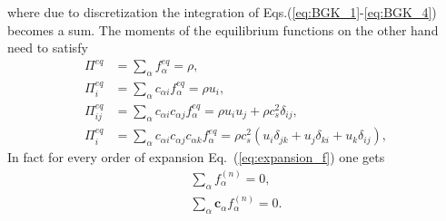 where due to discretization the integration of Eqs.(\ref{eq:BGK_1}-\ref{eq:BGK_4}) becomes a sum.
The moments of the equilibrium functions on the other hand need to satisfy~\cite{chen1998lattice} 
\begin{align}
    \Pi^{eq} &= \sum_{\alpha} f_{\alpha}^{eq} = \rho, \label{eq:moments_equilibria_1}\\
    \Pi^{eq}_i &= \sum_{\alpha} c_{\alpha i}f_{\alpha}^{eq} = \rho u_i, \label{eq:moments_equilibria_2}\\
    \Pi^{eq}_{i j} &= \sum_{\alpha} c_{\alpha i} c_{\alpha j}f_{\alpha}^{eq} = \rho u_i u_j + \rho c_s^2\delta_{i j}, \label{eq:moments_equilibria_3}\\
    \Pi^{eq}_i &= \sum_{\alpha} c_{\alpha i} c_{\alpha j} c_{\alpha k}f_{\alpha}^{eq} = \rho c_s^2(u_i\delta_{j k} + u_j\delta_{k i} + u_k\delta_{i j}), \label{eq:moments_equilibria_4}
\end{align}
In fact for every order of expansion Eq.~(\ref{eq:expansion_f}) one gets
\begin{align}\label{eq:all_order_constraint}
    \sum_{\alpha} f_{\alpha}^{(n)} = 0, \\
    \sum_{\alpha} \mathbf{c}_{\alpha}f_{\alpha}^{(n)} = 0. 
\end{align}

